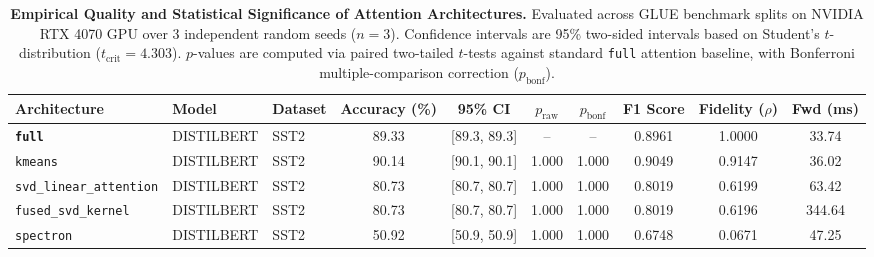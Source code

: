 \begin{table}[t]
\centering
\small
\caption{\textbf{Empirical Quality and Statistical Significance of Attention Architectures.} Evaluated across GLUE benchmark splits on NVIDIA RTX 4070 GPU over 3 independent random seeds ($n=3$). Confidence intervals are 95\% two-sided intervals based on Student's $t$-distribution ($t_{\text{crit}}=4.303$). $p$-values are computed via paired two-tailed $t$-tests against standard \texttt{full} attention baseline, with Bonferroni multiple-comparison correction ($p_{\text{bonf}}$).}
\label{tab:quality_benchmark_results}
\begin{tabular}{l l l c c c c c c c}
\toprule
\textbf{Architecture} & \textbf{Model} & \textbf{Dataset} & \textbf{Accuracy (\%)} & \textbf{95\% CI} & \textbf{$p_{\text{raw}}$} & \textbf{$p_{\text{bonf}}$} & \textbf{F1 Score} & \textbf{Fidelity ($\rho$)} & \textbf{Fwd (ms)} \\
\midrule
\textbf{\texttt{full}} & DISTILBERT & SST2 & 89.33 & [89.3, 89.3] & -- & -- & 0.8961 & 1.0000 & 33.74 \\
\texttt{kmeans} & DISTILBERT & SST2 & 90.14 & [90.1, 90.1] & 1.000 & 1.000 & 0.9049 & 0.9147 & 36.02 \\
\texttt{svd\_linear\_attention} & DISTILBERT & SST2 & 80.73 & [80.7, 80.7] & 1.000 & 1.000 & 0.8019 & 0.6199 & 63.42 \\
\texttt{fused\_svd\_kernel} & DISTILBERT & SST2 & 80.73 & [80.7, 80.7] & 1.000 & 1.000 & 0.8019 & 0.6196 & 344.64 \\
\texttt{spectron} & DISTILBERT & SST2 & 50.92 & [50.9, 50.9] & 1.000 & 1.000 & 0.6748 & 0.0671 & 47.25 \\
\bottomrule
\end{tabular}
\end{table}